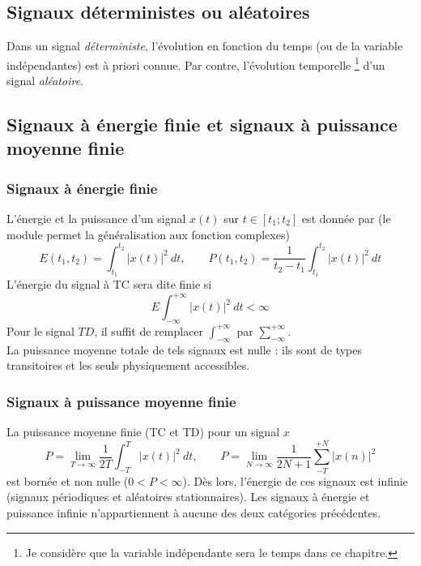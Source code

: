 	\subsection{Signaux déterministes ou aléatoires}
	Dans un signal \textit{déterministe}, l'évolution en fonction du temps (ou de la 
	variable indépendantes) est à priori connue. Par contre, l'évolution temporelle
	\footnote{Je considère que la variable indépendante sera le temps dans ce chapitre.} 
	d'un signal \textit{aléatoire}.
	
	\subsection{Signaux à énergie finie et signaux à puissance moyenne finie}
	\subsubsection{Signaux à énergie finie}
	L'énergie et la puissance d'un signal $x(t)$ sur $t \in [t_1;t_2]$ est donnée par 
	(le module permet la généralisation aux fonction complexes)
	\begin{equation}
	E(t_1,t_2) = \int_{t_1}^{t_2} |x(t)|^2\ dt,\qquad
	P(t_1,t_2) = \dfrac{1}{t_2-t_1}\int_{t_1}^{t_2} |x(t)|^2\ dt
	\end{equation}
	L'énergie du signal à TC sera dite finie si
	\begin{equation}
	E \int_{-\infty}^{+\infty} |x(t)|^2\ dt < \infty
	\end{equation}
	Pour le signal $TD$, il suffit de remplacer $\int_{-\infty}^{+\infty}$ par 
	$\sum_{-\infty}^{+\infty}$.\\
	La puissance moyenne totale de tels signaux est nulle : ils sont de types 
	transitoires et les seuls physiquement accessibles.
	
	\subsubsection{Signaux à puissance moyenne finie}
	La puissance moyenne finie (TC et TD) pour un signal $x$
	\begin{equation}
	P = \lim\limits_{T\rightarrow\infty} \dfrac{1}{2T}\int_{-T}^T |x(t)|^2\ dt,\qquad
	P = \lim\limits_{N\rightarrow\infty} \dfrac{1}{2N+1}\sum_{-T}^{+N} |x(n)|^2
	\end{equation}
	est bornée et non nulle ($0<P<\infty$). Dès lors, l'énergie de ces signaux est 
	infinie (signaux périodiques et aléatoires stationnaires). Les signaux à énergie 
	et puissance infinie n'appartiennent à aucune des deux catégories précédentes.
	

